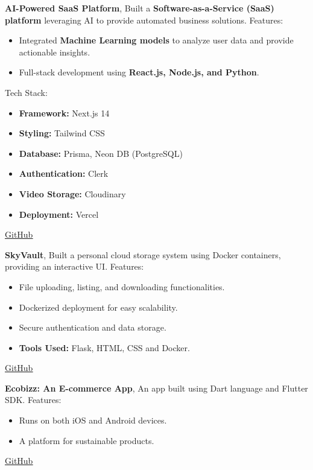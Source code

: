 \documentclass[letterpaper,11pt]{article}
\newcommand{\resumeItem}[1]{
  \item\small{
    {#1 \vspace{-1pt}}
  }
}
\begin{document}
        \newpage
        \resumeItem{\normalsize{\textbf{AI-Powered SaaS Platform}, Built a \textbf{Software-as-a-Service (SaaS) platform} leveraging AI to provide automated business solutions. 
        \newline
        Features:
        \begin{itemize}
            \item Integrated \textbf{Machine Learning models} to analyze user data and provide actionable insights.
            \item Full-stack development using \textbf{React.js, Node.js, and Python}.
        \end{itemize}
        Tech Stack:
        \begin{itemize}
            \item \textbf{Framework:} Next.js 14
            \item \textbf{Styling:} Tailwind CSS
            \item \textbf{Database:} Prisma, Neon DB (PostgreSQL)
            \item \textbf{Authentication:} Clerk
            \item \textbf{Video Storage:} Cloudinary
            \item \textbf{Deployment:} Vercel
        \end{itemize}} 
        \href{https://github.com/PriyanshuKSharma/ai-powered-saas.git}{\color{blue}\underline{GitHub}}}
        \vspace{2pt}

        
        \resumeItem{\normalsize{\textbf{SkyVault}, Built a personal cloud storage system using Docker containers, providing an interactive UI. 
        \newline
        Features:
        \begin{itemize}
            \item File uploading, listing, and downloading functionalities.
            \item Dockerized deployment for easy scalability.
            \item Secure authentication and data storage.
            \item \textbf{Tools Used:} Flask, HTML, CSS and Docker.
        \end{itemize}} 
        \href{https://github.com/PriyanshuKSharma/SkyVault}{\color{blue}\underline{GitHub}}}
        \vspace{2pt}
        
        \resumeItem{\normalsize{\textbf{Ecobizz: An E-commerce App}, An app built using Dart language and Flutter SDK. 
        \newline
        Features:
        \begin{itemize}
            \item Runs on both iOS and Android devices.
            \item A platform for sustainable products.
        \end{itemize}}  
        \href{https://github.com/PriyanshuKSharma/EcoBizz-Sustainably-Yours---GDSC-Solution-Challenge-2024.git}{\color{blue}\underline{GitHub}}}
        \vspace{2pt}
        
\end{document}
